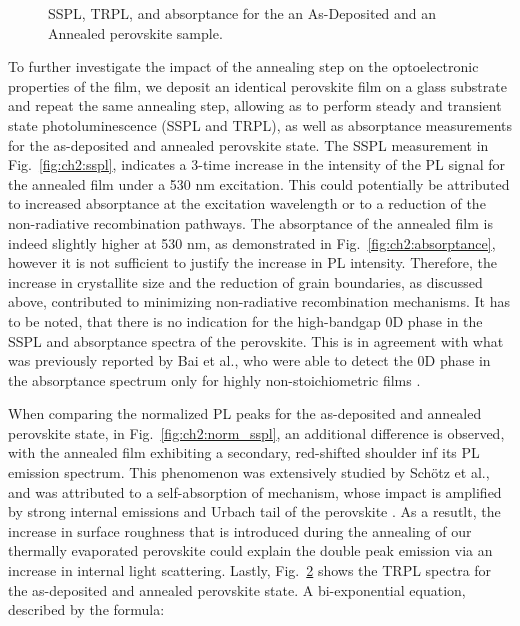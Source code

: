 \begin{figure}[htbp]
\begin{subfigure}[t]{0.4\textwidth}
        \caption{}
        \label{fig:ch2:trpl}
    \end{subfigure}
    \caption{SSPL, TRPL, and absorptance for the an As-Deposited and an Annealed perovskite sample.}
\end{figure}



To further investigate the impact of the annealing step on the optoelectronic properties of the film, we deposit an identical perovskite film on a glass substrate and repeat the same annealing step, allowing as to perform steady and transient state photoluminescence (SSPL and TRPL), as well as absorptance measurements for the as-deposited and annealed perovskite state. The SSPL measurement in Fig.~\ref{fig:ch2:sspl}, indicates a 3-time increase in the intensity of the PL signal for the annealed film under a 530 nm excitation. This could potentially be attributed to increased absorptance at the excitation wavelength or to a reduction of the non-radiative recombination pathways. The absorptance of the annealed film is indeed slightly higher at 530 nm, as demonstrated in Fig.~\ref{fig:ch2:absorptance}, however it is not sufficient to justify the increase in PL intensity. Therefore, the increase in crystallite size and the reduction of grain boundaries, as discussed above, contributed to minimizing non-radiative recombination mechanisms. It has to be noted, that there is no indication for the high-bandgap 0D  phase in the SSPL and absorptance spectra of the perovskite. This is in agreement with what was previously reported by Bai et al., who were able to detect the 0D phase in the absorptance spectrum only for highly non-stoichiometric films \cite{Bai2019AStability}. 

When comparing the normalized PL peaks for the as-deposited and annealed perovskite state, in Fig.~\ref{fig:ch2:norm_sspl}, an additional difference is observed, with the annealed film exhibiting a secondary, red-shifted shoulder inf its PL emission spectrum. This phenomenon was extensively studied by Schötz et al., and was attributed to a self-absorption of mechanism, whose impact is amplified by strong internal emissions and Urbach tail of the perovskite \cite{Schotz2020DoubleSelf-absorption}. As a resutlt, the increase in surface roughness that is introduced during the annealing of our thermally evaporated perovskite could explain the double peak emission via an increase in internal light scattering. Lastly, Fig.~\ref{fig:ch2:trpl} shows the TRPL spectra for the as-deposited and annealed perovskite state. A bi-exponential equation, described by the formula: 

